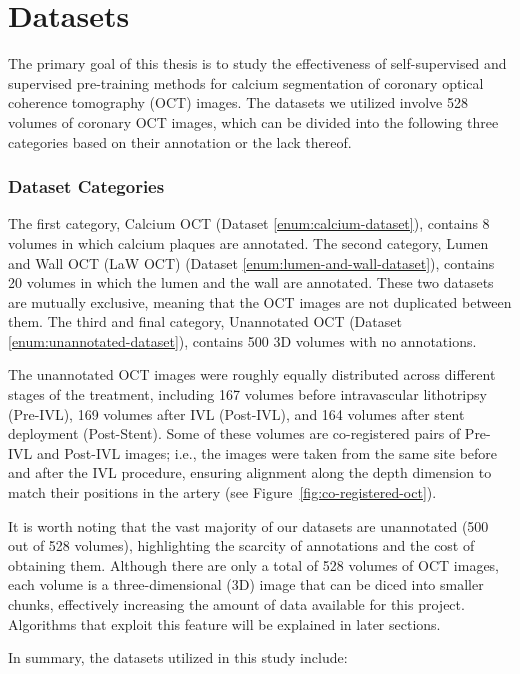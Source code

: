 \documentclass[a4paper,11pt,oneside]{report}
\begin{document}

\section{Datasets}\label{sec:design:datasets}
The primary goal of this thesis is to study the effectiveness of self-supervised and supervised pre-training methods for calcium segmentation of coronary optical coherence tomography (OCT) images. The datasets we utilized involve 528 volumes of coronary OCT images, which can be divided into the following three categories based on their annotation or the lack thereof. 

\subsubsection{Dataset Categories}

The first category, Calcium OCT (Dataset \ref{enum:calcium-dataset}), contains 8 volumes in which calcium plaques are annotated. The second category, Lumen and Wall OCT (LaW OCT) (Dataset \ref{enum:lumen-and-wall-dataset}), contains 20 volumes in which the lumen and the wall are annotated. These two datasets are mutually exclusive, meaning that the OCT images are not duplicated between them. The third and final category, Unannotated OCT (Dataset \ref{enum:unannotated-dataset}), contains 500 3D volumes with no annotations. 

The unannotated OCT images were roughly equally distributed across different stages of the treatment, including 167 volumes before intravascular lithotripsy (Pre-IVL), 169 volumes after IVL (Post-IVL), and 164 volumes after stent deployment (Post-Stent). Some of these volumes are co-registered pairs of Pre-IVL and Post-IVL images; i.e., the images were taken from the same site before and after the IVL procedure, ensuring alignment along the depth dimension to match their positions in the artery (see Figure~\ref{fig:co-registered-oct}). 

It is worth noting that the vast majority of our datasets are unannotated (500 out of 528 volumes), highlighting the scarcity of annotations and the cost of obtaining them. Although there are only a total of 528 volumes of OCT images, each volume is a three-dimensional (3D) image that can be diced into smaller chunks, effectively increasing the amount of data available for this project. Algorithms that exploit this feature will be explained in later sections.

In summary, the datasets utilized in this study include:
\end{document}
